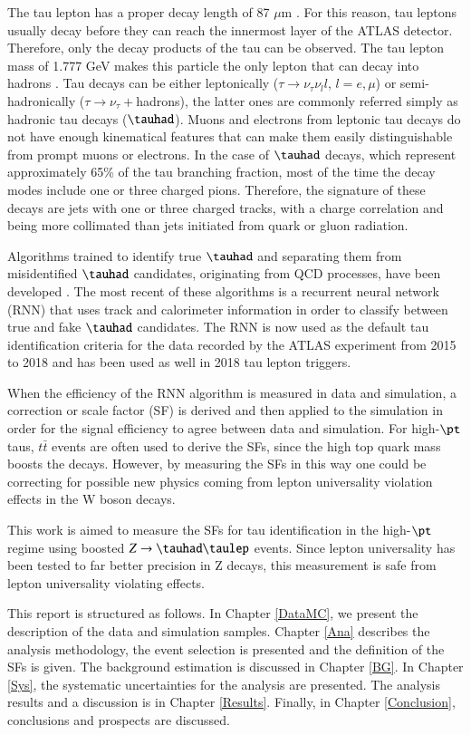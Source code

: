 The tau lepton has a proper decay length of 87 $\mu$m \cite{PhysRevD.98.030001}. For this reason, tau leptons usually decay before they can reach the innermost layer of the ATLAS detector. Therefore, only the decay products of the tau  can be observed. The tau lepton mass of 1.777 GeV makes this particle the only lepton that can decay into hadrons \cite{PhysRevD.98.030001}. Tau decays can be either leptonically ($\tau\to\nu_\tau\nu_l l$, $l=e,\mu$) or semi-hadronically ($\tau\to\nu_\tau+$hadrons), the latter ones are commonly referred simply as hadronic tau decays ($\tauhad$). Muons and electrons from leptonic tau decays do not have enough kinematical features that can make them easily distinguishable from prompt muons or electrons. In the case of $\tauhad$ decays, which represent approximately 65\% of the tau branching fraction, most of the time the decay modes include one or three charged pions. Therefore, the signature of these decays are jets with one or three charged tracks, with a charge correlation and being more collimated than jets initiated from quark or gluon radiation.

Algorithms trained to identify true $\tauhad$ and separating them from misidentified $\tauhad$  candidates, originating from QCD processes, have been developed \cite{Deutsch:2680523}. The most recent of these algorithms is a recurrent neural network (RNN) that uses track and calorimeter information in order to classify between true and fake $\tauhad$ candidates. The RNN is now used as the default tau identification criteria for the data recorded by the ATLAS experiment from 2015 to 2018 and has been used as well in 2018 tau lepton triggers.

When the efficiency of the RNN algorithm is measured in data and simulation, a correction or scale factor (SF) is derived and then applied to the simulation in order for the signal efficiency to agree between data and simulation. For high-$\pt$ taus, $t\bar{t}$ events are often used to derive the SFs, since the high top quark mass boosts the decays. However, by measuring the SFs in this way one could be correcting for possible new physics coming from lepton universality violation effects in the W boson decays.

This work is aimed to measure the SFs for tau identification in the high-$\pt$ regime using boosted $Z\to\tauhad\taulep$ events. Since lepton universality has been tested to far better precision in Z decays, this measurement is safe from lepton universality violating effects.

This report is structured as follows. In Chapter \ref{DataMC}, we present the description of the data and simulation samples. Chapter \ref{Ana}  describes the analysis methodology, the event selection is presented and the definition of the SFs is given. The background estimation is discussed in Chapter \ref{BG}. In Chapter \ref{Sys}, the systematic uncertainties for the analysis are presented. The analysis results and a discussion is in Chapter \ref{Results}. Finally, in Chapter \ref{Conclusion}, conclusions and prospects are discussed.
